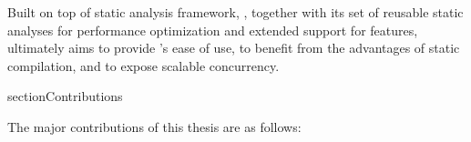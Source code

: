 Built on top of \mclab static analysis framework\cite{JesseThesis, TamerPaper},
\mixten, together with its set of reusable static analyses for performance
optimization and extended support for \matlab features, ultimately aims to
provide \matlab's ease of use, to benefit from the advantages of static 
compilation, and to expose scalable concurrency.  


section{Contributions}

The major contributions  of this thesis are as follows:

